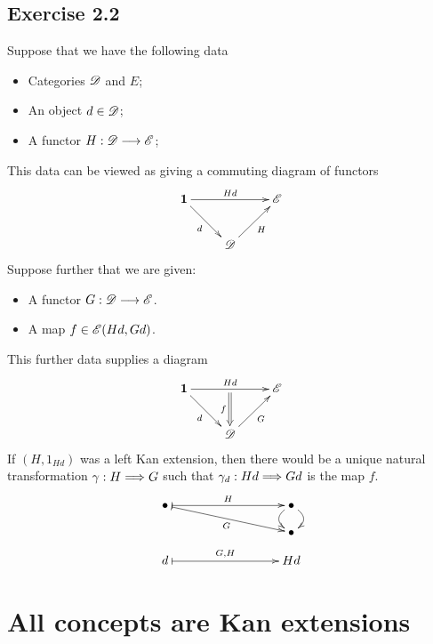 \documentclass[11pt]{article}
\begin{document}
\begin{solutions}
\subsection*{Exercise 2.2}
Suppose that we have the following data
\begin{itemize}\squishlist
\item Categories $\mathscr{D}$ and $E$;
\item An object $d\in \mathscr{D}$;
\item A functor $H:\mathscr{D}\longrightarrow \mathscr{E}$;
\end{itemize}
This data can be viewed as giving a commuting diagram of functors
\[\xymatrix{
\textbf{1}\ar[rr]^-{Hd}_-{}="1" \ar[rd]_-{d}&%
&%
\scrE\\%
&%
\scrD\ar@{->}[ru]_H&%
}\]
Suppose further that we are given:
\begin{itemize}\squishlist
\item A functor $G:\mathscr{D}\longrightarrow \mathscr{E}$.
\item A map $f\in \mathscr{E}(Hd,Gd)$.
\end{itemize}
This further data supplies a diagram
\[\xymatrix{
\textbf{1}\ar[rr]^-{Hd}_-{}="arF"="1" \ar[rd]_-{d}&%
&%
\scrE\\%
&%
\scrD\ar@{->}[ru]_G\ar@{=>}"arF";[]_-{f}&%
}\]
If $(H,1_{Hd})$ was a left Kan extension, then there would be a unique natural transformation $\gamma:H\Longrightarrow G$ such that $\gamma_d:Hd\Longrightarrow Gd$ is the map $f$.
\[\xymatrix@R=.4cm@C=3cm{
\bullet\ar@{|->}[r]^-{H}\ar@{|->}[rd]_-{G}&%
\bullet\ar@/^1em/[d]\ar@/_1em/[d]\\%
&%
\bullet\\%
d\ar@{|->}[r]^-{G,H}&%
Hd%
}\]
\end{solutions}

\section*{All concepts are Kan extensions}
\end{document}
